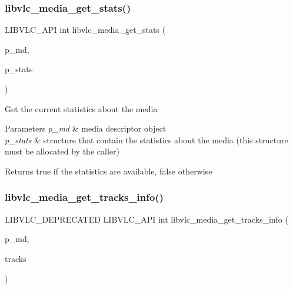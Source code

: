 \subsubsection{\texorpdfstring{libvlc\+\_\+media\+\_\+get\+\_\+stats()}{libvlc\_media\_get\_stats()}}
{\footnotesize\ttfamily L\+I\+B\+V\+L\+C\+\_\+\+A\+PI int libvlc\+\_\+media\+\_\+get\+\_\+stats (\begin{DoxyParamCaption}\item[{libvlc\+\_\+media\+\_\+t $\ast$}]{p\+\_\+md,  }\item[{\hyperlink{structlibvlc__media__stats__t}{libvlc\+\_\+media\+\_\+stats\+\_\+t} $\ast$}]{p\+\_\+stats }\end{DoxyParamCaption})}

Get the current statistics about the media 
\begin{DoxyParams}{Parameters}
{\em p\+\_\+md} & media descriptor object \\
\hline
{\em p\+\_\+stats} & structure that contain the statistics about the media (this structure must be allocated by the caller) \\
\hline
\end{DoxyParams}
\begin{DoxyReturn}{Returns}
true if the statistics are available, false otherwise
\end{DoxyReturn}
\mbox{\label{group__libvlc__media_ga2102c151df0ab66d6158a80b7734f0f9}} 
\subsubsection{\texorpdfstring{libvlc\+\_\+media\+\_\+get\+\_\+tracks\+\_\+info()}{libvlc\_media\_get\_tracks\_info()}}
{\footnotesize\ttfamily L\+I\+B\+V\+L\+C\+\_\+\+D\+E\+P\+R\+E\+C\+A\+T\+ED L\+I\+B\+V\+L\+C\+\_\+\+A\+PI int libvlc\+\_\+media\+\_\+get\+\_\+tracks\+\_\+info (\begin{DoxyParamCaption}\item[{libvlc\+\_\+media\+\_\+t $\ast$}]{p\+\_\+md,  }\item[{libvlc\+\_\+media\+\_\+track\+\_\+info\+\_\+t $\ast$$\ast$}]{tracks }\end{DoxyParamCaption})}

